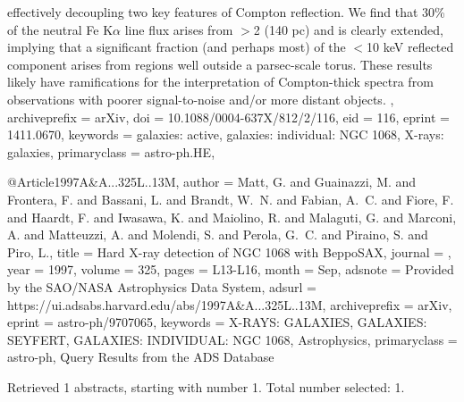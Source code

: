 \documentclass[longauth]{aa}
\begin{document}
{{{{{{{{{{{{effectively decoupling two key features of Compton reflection. We find
that {\ap}30\% of the neutral Fe K{$\alpha$} line flux arises from
$\gt$2{\Prime} ({\ap}140 pc) and is clearly extended, implying that a
significant fraction (and perhaps most) of the $\lt$10 keV reflected
component arises from regions well outside a parsec-scale torus. These
results likely have ramifications for the interpretation of
Compton-thick spectra from observations with poorer signal-to-noise
and/or more distant objects.
},
  archiveprefix = {arXiv},
  doi           = {10.1088/0004-637X/812/2/116},
  eid           = {116},
  eprint        = {1411.0670},
  keywords      = {galaxies: active, galaxies: individual: NGC 1068, X-rays: galaxies},
  primaryclass  = {astro-ph.HE},
}

@Article{1997A&A...325L..13M,
  author        = {{Matt}, G. and {Guainazzi}, M. and {Frontera}, F. and {Bassani}, L. and {Brandt}, W.~N. and {Fabian}, A.~C. and {Fiore}, F. and {Haardt}, F. and {Iwasawa}, K. and {Maiolino}, R. and {Malaguti}, G. and {Marconi}, A. and {Matteuzzi}, A. and {Molendi}, S. and {Perola}, G.~C. and {Piraino}, S. and {Piro}, L.},
  title         = {Hard X-ray detection of NGC 1068 with BeppoSAX},
  journal       = {\aap},
  year          = {1997},
  volume        = {325},
  pages         = {L13-L16},
  month         = {Sep},
  adsnote       = {Provided by the SAO/NASA Astrophysics Data System},
  adsurl        = {https://ui.adsabs.harvard.edu/abs/1997A&A...325L..13M},
  archiveprefix = {arXiv},
  eprint        = {astro-ph/9707065},
  keywords      = {X-RAYS: GALAXIES, GALAXIES: SEYFERT, GALAXIES: INDIVIDUAL: NGC 1068, Astrophysics},
  primaryclass  = {astro-ph},
}
Query Results from the ADS Database


Retrieved 1 abstracts, starting with number 1.  Total number selected: 1.

}}}}}}}}}}
\end{document}
